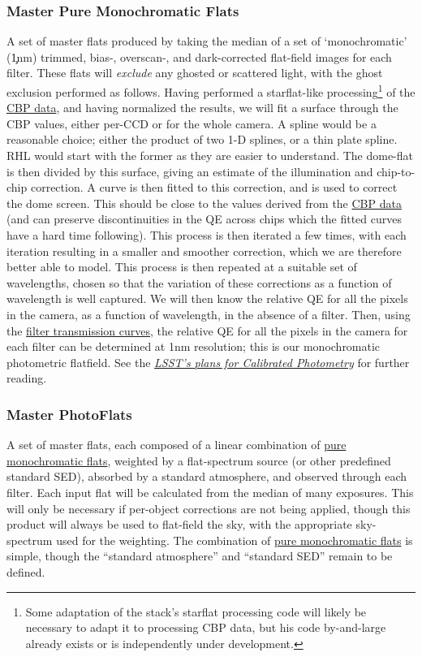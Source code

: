 \subsubsection{Master Pure Monochromatic Flats}\label{sec:CPP:output:monoPhotoFlat}
A set of master flats produced by taking the median of a set of `monochromatic' (\c 1nm) trimmed, bias-, overscan-, and dark-corrected flat-field images for each filter. These flats will \emph{exclude} any ghosted or scattered light, with the ghost exclusion performed as follows.
\alg Having performed a starflat-like processing\footnote{ Some adaptation of the stack's starflat processing code will likely be necessary to adapt it to processing CBP data, but his code by-and-large already exists or is independently under development.} of the \hyperref[sec:CPP:inputs:CBP]{CBP data}, and having normalized the results, we will fit a surface through the CBP values, either per-CCD or for the whole camera. A spline would be a reasonable choice; either the product of two 1-D splines, or a thin plate spline. RHL would start with the former as they are easier to understand. The dome-flat is then divided by this surface, giving an estimate of the illumination and chip-to-chip correction. A curve is then fitted to this correction, and is used to correct the dome screen. This should be close to the values derived from the \hyperref[sec:CPP:inputs:CBP]{CBP data} (and can preserve discontinuities in the QE across chips which the fitted curves have a hard time following). This process is then iterated a few times, with each iteration resulting in a smaller and smoother correction, which we are therefore better able to model. This process is then repeated at a suitable set of wavelengths, chosen so that the variation of these corrections as a function of wavelength is well captured. We will then know the relative QE for all the pixels in the camera, as a function of wavelength, in the absence of a filter. Then, using the \hyperref[sec:CPP:output:filterTransmission]{filter transmission curves}, the relative QE for all the pixels in the camera for each filter can be determined at 1nm resolution; this is our monochromatic photometric flatfield. See the \hyperref{https://github.com/lsst-dm/calibration/blob/master/calibration.pdf}{}{}{\emph{LSST's plans for Calibrated Photometry}} for further reading.

\subsubsection{Master PhotoFlats}\label{sec:CPP:output:standardPhotoFlat}
A set of master flats, each composed of a linear combination of \hyperref[sec:CPP:output:monoPhotoFlat]{pure monochromatic flats}, weighted by a flat-spectrum source (or other predefined standard SED), absorbed by a standard atmosphere, and observed through each filter. Each input flat will be calculated from the median of many exposures. This will only be necessary if per-object corrections are not being applied, though this product will always be used to flat-field the sky, with the appropriate sky-spectrum used for the weighting.
\alg The combination of \hyperref[sec:CPP:output:monoPhotoFlat]{pure monochromatic flats} is simple, though the ``standard atmosphere'' and ``standard SED'' remain to be defined.


